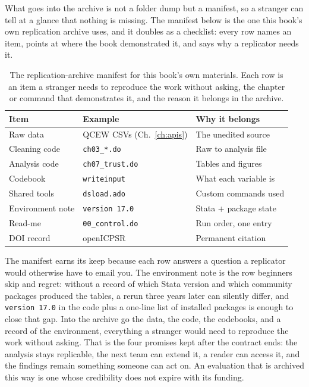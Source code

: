\documentclass[
    a4paper,
    fontsize=10pt,
    twoside=true,
    numbers=noenddot,
]{kaobook}
\begin{document}
What goes into the archive is not a folder dump but a manifest, so a stranger can tell at a glance that nothing is missing. The manifest below is the one this book's own replication archive uses, and it doubles as a checklist: every row names an item, points at where the book demonstrated it, and says why a replicator needs it.

\begin{table}[htbp]
\centering
\caption[A replication-archive manifest]{The replication-archive manifest for this book's own materials. Each row is an item a stranger needs to reproduce the work without asking, the chapter or command that demonstrates it, and the reason it belongs in the archive.}
\label{tab:manifest}
\begin{tabular}{lll}
\hline
Item              & Example              & Why it belongs \\
\hline
Raw data          & QCEW CSVs (Ch.~\ref{ch:apis})  & The unedited source \\
Cleaning code     & \texttt{ch03\_*.do}  & Raw to analysis file \\
Analysis code     & \texttt{ch07\_trust.do} & Tables and figures \\
Codebook          & \texttt{writeinput}  & What each variable is \\
Shared tools      & \texttt{dsload.ado}  & Custom commands used \\
Environment note  & \texttt{version 17.0} & Stata + package state \\
Read-me           & \texttt{00\_control.do} & Run order, one entry \\
DOI record        & openICPSR            & Permanent citation \\
\hline
\end{tabular}
\end{table}

The manifest earns its keep because each row answers a question a replicator would otherwise have to email you. The environment note is the row beginners skip and regret: without a record of which Stata version and which community packages produced the tables, a rerun three years later can silently differ, and \texttt{version 17.0} in the code plus a one-line list of installed packages is enough to close that gap. Into the archive go the data, the code, the codebooks, and a record of the environment, everything a stranger would need to reproduce the work without asking. That is the four promises kept after the contract ends: the analysis stays replicable, the next team can extend it, a reader can access it, and the findings remain something someone can act on. An evaluation that is archived this way is one whose credibility does not expire with its funding.
\end{document}
